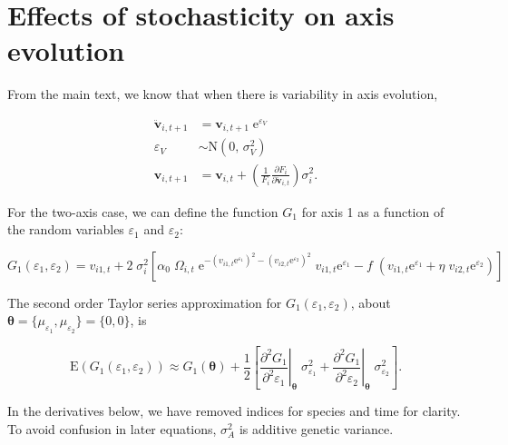 \section*{Effects of stochasticity on axis evolution}

From the main text, we know that when there is variability in axis evolution, 

\begin{equation*}
\begin{split}
    \mathbf{\ddot{v}}_{i,t+1} &= \mathbf{v}_{i,t+1} \; \text{e}^{\varepsilon_V} \\
    \varepsilon_V &\sim \text{N}(0, \, \sigma^2_V) \\
    \mathbf{v}_{i,t+1} &= \mathbf{v}_{i,t} + \left( \frac{1}{F_i}
        \frac{\partial F_i}{\partial \mathbf{\ddot{v}}_{i,t}} \right) \sigma^2_i
    \text{.}
\end{split}
\end{equation*}



For the two-axis case, we can define the function $G_1$ for axis 1 as a function 
of the random variables $\varepsilon_1$ and $\varepsilon_2$:

\begin{equation*}
    G_1(\varepsilon_1, \varepsilon_2) = v_{i1,t} + 2 \; \sigma_i^2
    \left[
        \alpha_0 \; \Omega_{i,t} \;
            \text{e}^{-(v_{i1,t} \text{e}^{\varepsilon_1})^2 - (v_{i2,t} \text{e}^{\varepsilon_2})^2} \; v_{i1,t} \text{e}^{\varepsilon_1}
        - f \; ( v_{i1,t} \text{e}^{\varepsilon_1} + \eta \; v_{i2,t} \text{e}^{\varepsilon_2} )
    \right]
\end{equation*}


The second order Taylor series approximation for $G_1(\varepsilon_1, \varepsilon_2)$,
about $\bm{\theta} = \{ \mu_{\varepsilon_1}, \mu_{\varepsilon_2} \} = \{ 0, 0 \}$, is

\begin{equation}
\label{eq:taylor-expansion-outline}
    \text{E}(G_1(\varepsilon_1, \varepsilon_2)) \approx G_1(\bm{\theta}) + 
        \frac{1}{2} \left[ 
            \left. \frac{\partial^2 G_1}{\partial^2 \varepsilon_1} \right\lvert_{\bm{\theta}} \; \sigma^2_{\varepsilon_1} +
            \left. \frac{\partial^2 G_1}{\partial^2 \varepsilon_2} \right\lvert_{\bm{\theta}} \; \sigma^2_{\varepsilon_2}
        \right]
\text{.}
\end{equation}


In the derivatives below, we have removed indices for species and time for clarity.
To avoid confusion in later equations, $\sigma_A^2$ is additive genetic variance.

